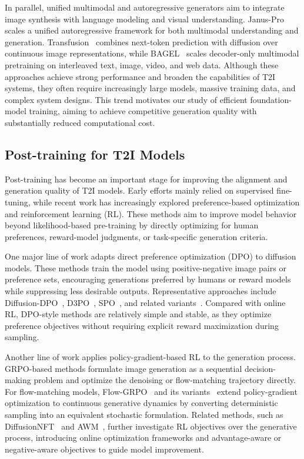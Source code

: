 \documentclass{llmxive}
\begin{document}
In parallel, unified multimodal and autoregressive generators aim to integrate image synthesis with language modeling and visual understanding. Janus-Pro~\citep{chen2025januspro} scales a unified autoregressive framework for both multimodal understanding and generation. Transfusion~\citep{zhou2024transfusion} combines next-token prediction with diffusion over continuous image representations, while BAGEL~\citep{deng2025BAGEL} scales decoder-only multimodal pretraining on interleaved text, image, video, and web data. Although these approaches achieve strong performance and broaden the capabilities of T2I systems, they often require increasingly large models, massive training data, and complex system designs. This trend motivates our study of efficient foundation-model training, aiming to achieve competitive generation quality with substantially reduced computational cost.

\subsection{Post-training for T2I Models}

Post-training has become an important stage for improving the alignment and generation quality of T2I models. Early efforts mainly relied on supervised fine-tuning, while recent work has increasingly explored preference-based optimization and reinforcement learning (RL). These methods aim to improve model behavior beyond likelihood-based pre-training by directly optimizing for human preferences, reward-model judgments, or task-specific generation criteria.

One major line of work adapts direct preference optimization (DPO) to diffusion models. These methods train the model using positive-negative image pairs or preference sets, encouraging generations preferred by humans or reward models while suppressing less desirable outputs. Representative approaches include Diffusion-DPO~\citep{wallace2024diffusion}, D3PO~\citep{yang2024using}, SPO~\citep{liang2025aesthetic}, and related variants~\citep{yuan2024self,yang2024dense,li2024aligning,hong2026margin}. Compared with online RL, DPO-style methods are relatively simple and stable, as they optimize preference objectives without requiring explicit reward maximization during sampling.

Another line of work applies policy-gradient-based RL to the generation process. GRPO-based methods formulate image generation as a sequential decision-making problem and optimize the denoising or flow-matching trajectory directly. For flow-matching models, Flow-GRPO~\citep{liu2025flow} and its variants~\citep{li2025mixgrpo,wang2025pref} extend policy-gradient optimization to continuous generative dynamics by converting deterministic sampling into an equivalent stochastic formulation. Related methods, such as DiffusionNFT~\citep{zheng2025diffusionnft} and AWM~\citep{xue2025advantage}, further investigate RL objectives over the generative process, introducing online optimization frameworks and advantage-aware or negative-aware objectives to guide model improvement.
\end{document}
